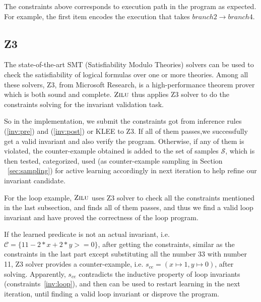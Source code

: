 The constraints above corresponds to execution path in the program as expected.
For example, the first item encodes the execution that takes $branch2 \to branch4$.


\subsection{Z3}
\label{subsec:z3}
The state-of-the-art SMT (Satisfiability Modulo Theories)\cite{barrett2009satisfiability}  solvers can be used to 
check the satisfiability of logical formulas over one or more theories. 
Among all these solvers, Z3\cite{de2008z3}, from Microsoft Research, is a high-performance theorem prover which is both sound and complete.
$\textsc{Zilu}$ thus applies Z3 solver to do the constraints solving for the invariant validation task. 

So in the implementation, we submit the constraints got from inference rules (\ref{inv:pre}) and (\ref{inv:post}) or KLEE to Z3.
If all of them passes,we successfully get a valid invariant and also verify the program. 
Otherwise, if any of them is violated, the counter-example obtained is added to the set of samples $\mathcal{S}$, 
which is then tested, categorized, used (as counter-example sampling in Section ~\ref{sec:sampling}) for active learning accordingly 
in next iteration to help refine our invariant candidate.

For the loop example, $\textsc{Zilu}$ uses Z3 solver to check all the constraints mentioned in the last subsection,
and finds all of them passes, and thus we find a valid loop invariant and have proved the correctness of the loop program.

If the learned predicate is not an actual invariant, i.e. $\mathcal{C} = \{11-2*x+2*y>=0\}$,
after getting the constraints, similar as the constraints in the last part except substituting all the number 33 with number 11, 
Z3 solver provides a counter-example, i.e. $s_{ce} = (x \mapsto 1, y \mapsto 0)$, after solving.
Apparently, $s_{ce}$ contradicts the inductive property of loop invariants (constraints~\ref{inv:loop}), 
and then can be used to restart learning in the next iteration, until finding a valid loop invariant or disprove the program.


